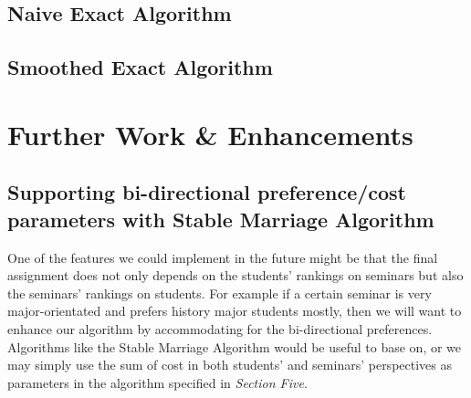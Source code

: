 \documentclass{article} %
\begin{document}
\subsection{Naive Exact Algorithm}
\subsection{Smoothed Exact Algorithm}


\section{Further Work \& Enhancements}

\subsection{Supporting bi-directional preference/cost parameters with Stable Marriage Algorithm}
   \par\qquad One of the features we could implement in the future might be that the final assignment does not only depends on the students' rankings on seminars but also the seminars' rankings on students. For example if a certain seminar is very major-orientated and prefers history major students mostly, then we will want to enhance our algorithm by accommodating for the bi-directional preferences. Algorithms like the Stable Marriage Algorithm would be useful to base on, or we may simply use the sum of cost in both students' and seminars' perspectives as parameters in the algorithm specified in \emph{Section Five}.
   
\end{document}
